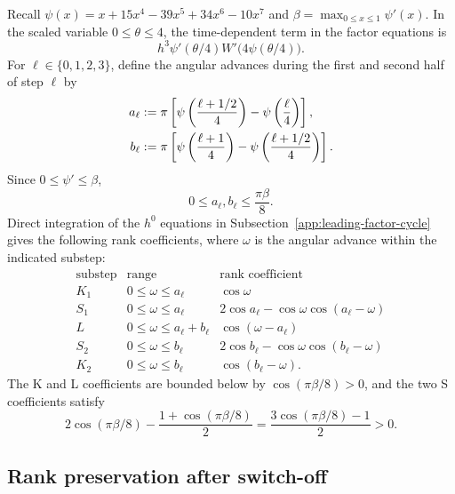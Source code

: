 \documentclass[10pt,a4paper]{amsart}
\numberwithin{equation}{section}
\begin{document}
Recall
\(
 \psi(x)=x+15x^4-39x^5+34x^6-10x^7
\)
and \(\beta=\max_{0\le x\le1}\psi'(x)\).  In the scaled variable
\(0\le\theta\le4\), the time-dependent term in the factor equations is
\begin{equation}\label{eq:switch-off-scaled}
 h^3\psi'(\theta/4)W'\bigl(4\psi(\theta/4)\bigr).
\end{equation}
For \(\ell\in\{0,1,2,3\}\), define the angular advances during the
first and second half of step \(\ell\) by
\begin{align}
 a_\ell&:=\pi\left[
 \psi\left(\frac{\ell+1/2}{4}\right)
 -\psi\left(\frac{\ell}{4}\right)\right],\notag\\
 b_\ell&:=\pi\left[
 \psi\left(\frac{\ell+1}{4}\right)
 -\psi\left(\frac{\ell+1/2}{4}\right)\right].
 \label{eq:switch-off-half-step-angles}
\end{align}
Since \(0\le\psi'\le\beta\),
\begin{equation}\label{eq:reduction-angular-increments}
 0\le a_\ell,b_\ell\le\frac{\pi\beta}{8}.
\end{equation}
Direct integration of the $h^0$ equations in
Subsection~\ref{app:leading-factor-cycle} gives the following rank
coefficients, where \(\omega\) is the angular advance within the
indicated substep:
\begin{equation}\label{eq:reduction-rank-coefficients}
\begin{array}{c|c|c}
\text{substep}&\text{range}&\text{rank coefficient}\\
\hline
K_1&0\le\omega\le a_\ell&\cos\omega\\
S_1&0\le\omega\le a_\ell&2\cos a_\ell-\cos\omega\cos(a_\ell-\omega)\\
L&0\le\omega\le a_\ell+b_\ell&\cos(\omega-a_\ell)\\
S_2&0\le\omega\le b_\ell&2\cos b_\ell-\cos\omega\cos(b_\ell-\omega)\\
K_2&0\le\omega\le b_\ell&\cos(b_\ell-\omega).
\end{array}
\end{equation}
The K and L coefficients are bounded below by
\(\cos(\pi\beta/8)>0\), and the two S coefficients satisfy
\begin{equation}\label{eq:reduction-rank-margin}
 2\cos(\pi\beta/8)-\frac{1+\cos(\pi\beta/8)}2
 =\frac{3\cos(\pi\beta/8)-1}{2}>0.
\end{equation}

\subsection{Rank preservation after switch-off}
\label{app:post-switch-rank}
\end{document}

